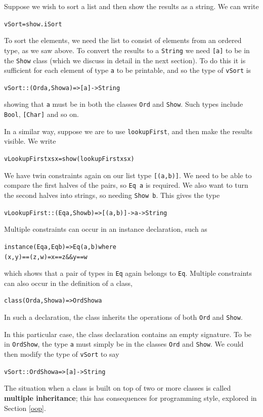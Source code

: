 Suppose we wish to sort a list and then show the results as a string. We can
write
\begin{alltt}
vSort = show . iSort 
\end{alltt}
To sort the elements, we need the list to consist of elements from an ordered
type, as we saw above.
To convert the results to a \texttt{String} we need \texttt{[a]} to be in the \texttt{Show} class (which we discuss in detail in the next section). To do this it is sufficient for each  element of type 
\texttt{a} to be printable, and so the type of \texttt{vSort} is 
\begin{alltt}
vSort :: (Ord a,Show a) => [a] -> String
\end{alltt}
showing that \texttt{a} must be in both the classes \texttt{Ord} and \texttt{Show}.
Such types include \texttt{Bool}, \texttt{[Char]} and so on.

In a similar way, suppose we are to use \texttt{lookupFirst}, and then make the
results visible. We write
\begin{alltt}
vLookupFirst xs x = show (lookupFirst xs x)
\end{alltt}
We have twin constraints again on our list type \texttt{[(a,b)]}. We need to be
able to compare the first halves of the pairs, so \texttt{Eq a} is required. We
also want to turn the second halves into strings, so needing \texttt{Show b}.
This gives the type
\begin{alltt}
vLookupFirst :: (Eq a,Show b) => [(a,b)] -> a -> String
\end{alltt}
Multiple constraints can occur in an instance declaration, such as
\begin{alltt}
instance (Eq a,Eq b) => Eq (a,b) where
  (x,y) == (z,w)  =  x==z \&\& y==w
\end{alltt}
which shows that a pair of types in \texttt{Eq} again belongs to
\texttt{Eq}. Multiple constraints can 
also occur in the definition of a class,
\begin{alltt}
class (Ord a,Show a) => OrdShow a
\end{alltt}
In such a declaration, the class inherits the operations of both \texttt{Ord}
and \texttt{Show}.

In this particular
case, the class declaration contains an empty signature. To be
in \texttt{OrdShow}, the type \texttt{a} must simply be in the classes \texttt{Ord} and
\texttt{Show}. We could then modify the type of \texttt{vSort} to say
\begin{alltt}
vSort :: OrdShow a => [a] -> String
\end{alltt}
The situation when a class is built on top of two or more classes is called
\textbf{multiple inheritance}; this has consequences for programming
style, explored in Section \ref{oop}.


